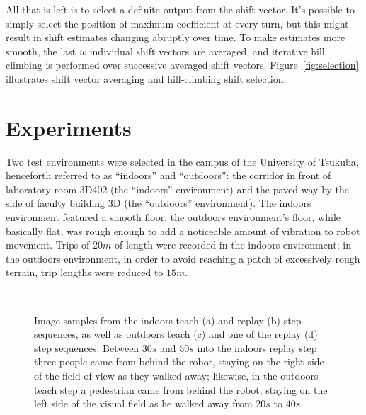 \documentclass[twocolumn, 9pt,fleqn]{jsproceedings}
\begin{document}
All that is left is to select a definite output from the shift vector. It's possible to simply select the position of maximum coefficient at every turn, but this might result in shift estimates changing abruptly over time. To make estimates more smooth, the last $w$ individual shift vectors are averaged, and iterative hill climbing is performed over successive averaged shift vectors. Figure~\ref{fig:selection} illustrates shift vector averaging and hill-climbing shift selection.

\section{Experiments}

Two test environments were selected in the campus of the University of Tsukuba, henceforth referred to as ``indoors'' and ``outdoors'': the corridor in front of laboratory room 3D402 (the ``indoors'' environment) and the paved way by the side of faculty building 3D (the ``outdoors'' environment). The indoors environment featured a smooth floor; the outdoors environment's floor, while basically flat, was rough enough to add a noticeable amount of vibration to robot movement. Trips of $20m$ of length were recorded in the indoors environment; in the outdoors environment, in order to avoid reaching a patch of excessively rough terrain, trip lengths were reduced to $15m$.

\begin{figure}[t]
\centering
{}%
\hspace{0.1\columnwidth}%
\\
%
\hspace{0.1\columnwidth}%
\caption{Image samples from the indoors teach (a) and replay (b) step sequences, as well as outdoors teach (c) and one of the replay (d) step sequences. Between $30s$ and $50s$ into the indoors replay step three people came from behind the robot, staying on the right side of the field of view as they walked away; likewise, in the outdoors teach step a pedestrian came from behind the robot, staying on the left side of the visual field as he walked away from $20s$ to $40s$.}
\label{fig:environments}
\end{figure}
\end{document}
